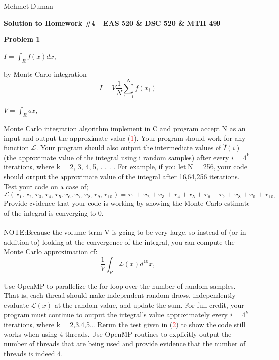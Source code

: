 \documentclass{article}
\begin{document}
\begin{flushright}
Mehmet Duman
\end{flushright}

\begin{center}
{\Large {\bf Solution to Homework \#4---EAS 520 \& DSC 520 \& MTH 499} }
\end{center}

{\bf Problem 1}




\begin{center}
$I = \int_{R} f(x) dx, $
\end{center}
by Monte Carlo integration
\begin{equation} \label{exp:eq0}
I = V  \frac{1} {N}  \displaystyle\sum_{i=1}^{ N} f(x_i)					
\end{equation}

\begin{center}
	$V = \int_{R} dx, $
\end{center}
Monte Carlo integration algorithm implement in C and program accept N as an input and output the approximate value  (\textcolor{red}{1}). Your program should work for any function $\mathcal{L}$. Your program should also output the intermediate values of $\hat{I}(i)$ (the approximate value of the integral using i random samples) after every $i = 4^k$ iterations, where k = 2, 3, 4, 5, . . . . For example, if you let N = 256, your code should output the approximate value of the integral after 16,64,256 iterations.  Test your code on a case of;
\begin{equation} \label{exp:eq0}
\mathcal{L}(x_1,x_2,x_3,x_4,x_5,x_6,x_7,x_8,x_9,x_{10})=x_1 +x_2 +x_3 +x_4 +x_5 +x_6 +x_7 +x_8 +x_9 +x_{10}, 
\end{equation}
Provide evidence that your code is working by showing the Monte Carlo estimate of the integral is converging to 0.
\\
\\
NOTE:Because the volume term V is going to be very large, so instead of (or in addition to) looking at the convergence of the integral, you can compute the Monte Carlo approximation of:
\begin{equation} \label{exp:eq0}
\frac{1} {V}  \int_{R} \mathcal{L}(x) d^{10}x, 
\end{equation}

Use OpenMP to parallelize the for-loop over the number of random samples. That is, each thread should make independent random draws, independently evaluate $\mathcal{L}(x)$ at the random value, and update the sum. For full credit, your program must continue to output the integral’s value approximately every $i = 4^k$ iterations, where k = 2,3,4,5...
Rerun the test given in (\textcolor{red}{2}) to show the code still works when using 4 threads. Use OpenMP routines to explicitly output the number of threads that are being used and provide evidence that the number of threads is indeed 4.
\\
\\
\end{document}
